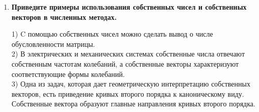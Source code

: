 \documentclass[12pt, a4paper]{article}
\begin{document}
\begin{enumerate}
    \item {\bf Приведите примеры использования собственных чисел и собственных векторов в численных методах. }
    
    \begin{enumerate}
		1) C помощью собственных чисел можно сделать вывод о числе обусловленности матрицы.\\
		2) В электрических и механических системах собственные числа отвечают собственным частотам колебаний,  а собственные векторы характеризуют соответствующие формы колебаний.\\
		3) Одна из задач, которая дает геометрическую интерпретацию собственных векторов, есть приведение кривых второго порядка к каноническому виду. Собственные вектора образуют главные направления кривых второго порядка.\\

	\end{enumerate}


    \end{enumerate}
\end{document}
